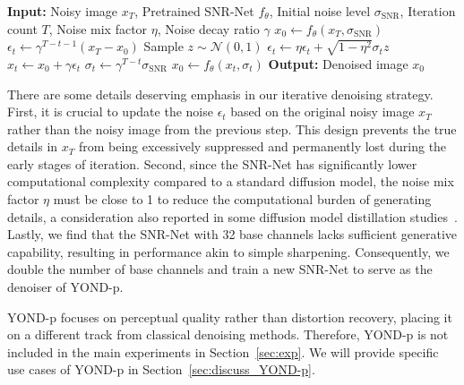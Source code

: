\documentclass[lettersize,journal]{IEEEtran}
\begin{document}
	\begin{algorithm}[t]
		\caption{DDIM-based Iterative Denoising Strategy}\label{alg:ddim}
		\begin{algorithmic}[1]
			\State \textbf{Input:} Noisy image $x_T$, Pretrained SNR-Net $f_{\theta}$, Initial noise level $\sigma_{\text{SNR}}$, Iteration count $T$, Noise mix factor $\eta$, Noise decay ratio $\gamma$
			\State $x_0 \gets f_{\theta}(x_T, \sigma_{\text{SNR}})$ 
			\State $\epsilon_t \gets \gamma^{T-t-1} (x_T - x_0)$ 
			\State Sample $z \sim \mathcal{N}(0,1)$
			\State $\epsilon_t \gets \eta \epsilon_t + \sqrt{1 - \eta^2} \sigma_t z$ 
			\State $x_t \gets x_0 + \gamma \epsilon_t$ 
			\State $\sigma_t \gets \gamma^{T-t}\sigma_{\text{SNR}}$ 
			\State $x_0 \gets f_{\theta}(x_t, \sigma_t)$ 
			\EndFor
			\State \textbf{Output:} Denoised image $x_0$
		\end{algorithmic}
	\end{algorithm}
	
	There are some details deserving emphasis in our iterative denoising strategy. 
	First, it is crucial to update the noise $\epsilon_t$ based on the original noisy image $x_T$ rather than the noisy image from the previous step. This design prevents the true details in $x_T$ from being excessively suppressed and permanently lost during the early stages of iteration.
	Second, since the SNR-Net has significantly lower computational complexity compared to a standard diffusion model, the noise mix factor $\eta$ must be close to 1 to reduce the computational burden of generating details, a consideration also reported in some diffusion model distillation studies~\cite{CVPR24/SinSR}. %
	Lastly, we find that the SNR-Net with 32 base channels lacks sufficient generative capability, resulting in performance akin to simple sharpening. Consequently, we double the number of base channels and train a new SNR-Net to serve as the denoiser of YOND-p.
	
	YOND-p focuses on perceptual quality rather than distortion recovery, placing it on a different track from classical denoising methods. Therefore, YOND-p is not included in the main experiments in Section~\ref{sec:exp}. We will provide specific use cases of YOND-p in Section~\ref{sec:discuss_YOND-p}.
	
\end{document}
